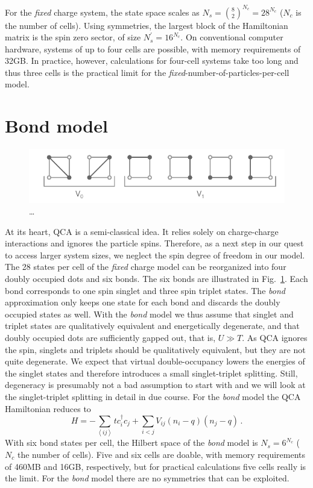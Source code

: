 For the \emph{fixed} charge system, the state space scales as $N_s =
\binom{8}{2}^{N_c} = 28^{N_c}$ ($N_c$ is the number of cells). Using symmetries,
the largest block of the Hamiltonian matrix is the spin zero sector, of size
$N_s^{\prime} = 16^{N_c}$. On conventional computer hardware, systems of up to
four cells are possible, with memory requirements of 32GB. In practice,
however, calculations for four-cell systems take too long and thus three
cells is the practical limit for the \emph{fixed}-number-of-particles-per-cell
model.


\section{Bond model}

%
\begin{figure}
  \center
  \includegraphics{bond}
  \caption{\ldots}
  \label{fig:bond}
\end{figure}
%
At its heart, QCA is a semi-classical idea. It relies solely on charge-charge
interactions and ignores the particle spins. Therefore, as a next step in our
quest to access larger system sizes, we neglect the spin degree of freedom in
our model. The 28 states per cell of the \emph{fixed} charge model can be
reorganized into four doubly occupied dots and six bonds. The six bonds are
illustrated in Fig.~\ref{fig:bond}. Each bond corresponds to one spin singlet
and three spin triplet states. The \emph{bond} approximation only keeps one
state for each bond and discards the doubly occupied states as well. With the
\emph{bond} model we thus assume that singlet and triplet states are
qualitatively equivalent and energetically degenerate, and that doubly occupied
dots are sufficiently gapped out, that is, $U \gg T$. As QCA ignores the spin,
singlets and triplets should be qualitatively equivalent, but they are not quite
degenerate. We expect that virtual double-occupancy lowers the energies of the
singlet states and therefore introduces a small singlet-triplet splitting.
Still, degeneracy is presumably not a bad assumption to start with and we will
look at the singlet-triplet splitting in detail in due course. For the
\emph{bond} model the QCA Hamiltonian reduces to
%
\begin{equation}
  \label{eq:H_bond}
  H = - \sum_{\left<ij\right>} t c_i^{\dagger} c_j
      + \sum_{i<j} V_{ij} \left( n_i - q \right) \left( n_j - q \right) \, .
\end{equation}
%
With six bond states per cell, the Hilbert space of the \emph{bond} model is
$N_s = 6^{N_c}$ ($N_c$ the number of cells). Five and six cells are doable, with
memory requirements of 460MB and 16GB, respectively, but for practical
calculations five cells really is the limit. For the \emph{bond} model there are
no symmetries that can be exploited.



